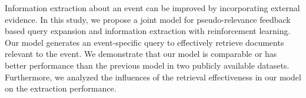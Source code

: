 Information extraction about an event can be improved by incorporating external evidence. In this study, we propose a joint model for pseudo-relevance feedback based query expansion and information extraction with reinforcement learning. Our model generates an event-specific query to effectively retrieve documents relevant to the event. We demonstrate that our model is comparable or has better performance than the previous model in two publicly available datasets. Furthermore, we analyzed the influences of the retrieval effectiveness in our model on the extraction performance.
